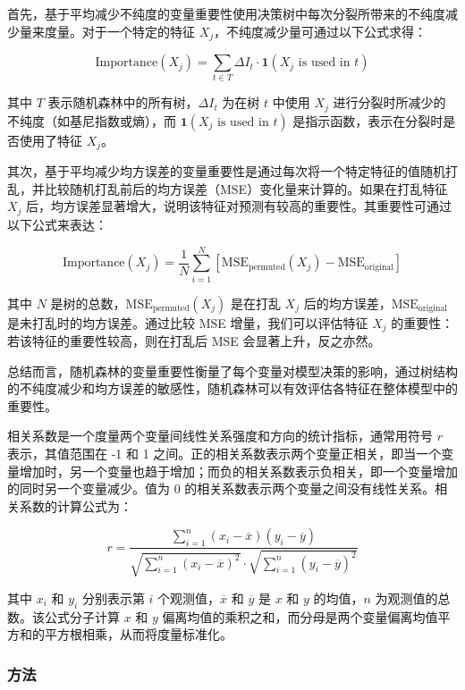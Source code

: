 \documentclass{article}
\begin{document}
	首先，基于平均减少不纯度的变量重要性使用决策树中每次分裂所带来的不纯度减少量来度量。对于一个特定的特征 \( X_j \)，不纯度减少量可通过以下公式求得：
	
	\[
	\text{Importance}(X_j) = \sum_{t \in T} \Delta I_t \cdot \mathbf{1}(X_j \text{ is used in } t)
	\]
	
	其中 \( T \) 表示随机森林中的所有树，\( \Delta I_t \) 为在树 \( t \) 中使用 \( X_j \) 进行分裂时所减少的不纯度（如基尼指数或熵），而 \( \mathbf{1}(X_j \text{ is used in } t) \) 是指示函数，表示在分裂时是否使用了特征 \( X_j \)。
	
	其次，基于平均减少均方误差的变量重要性是通过每次将一个特定特征的值随机打乱，并比较随机打乱前后的均方误差（MSE）变化量来计算的。如果在打乱特征 \( X_j \) 后，均方误差显著增大，说明该特征对预测有较高的重要性。其重要性可通过以下公式来表达：
	
	\[
	\text{Importance}(X_j) = \frac{1}{N} \sum_{i=1}^{N} \left[ \text{MSE}_{\text{permuted}}(X_j) - \text{MSE}_{\text{original}} \right]
	\]
	
	其中 \( N \) 是树的总数，\( \text{MSE}_{\text{permuted}}(X_j) \) 是在打乱 \( X_j \) 后的均方误差，\( \text{MSE}_{\text{original}} \) 是未打乱时的均方误差。通过比较 MSE 增量，我们可以评估特征 \( X_j \) 的重要性：若该特征的重要性较高，则在打乱后 MSE 会显著上升，反之亦然。
	
	总结而言，随机森林的变量重要性衡量了每个变量对模型决策的影响，通过树结构的不纯度减少和均方误差的敏感性，随机森林可以有效评估各特征在整体模型中的重要性。
	
	相关系数是一个度量两个变量间线性关系强度和方向的统计指标，通常用符号 \( r \) 表示，其值范围在 -1 和 1 之间。正的相关系数表示两个变量正相关，即当一个变量增加时，另一个变量也趋于增加；而负的相关系数表示负相关，即一个变量增加的同时另一个变量减少。值为 0 的相关系数表示两个变量之间没有线性关系。相关系数的计算公式为：
	
	\[
	r = \frac{\sum_{i=1}^{n} (x_i - \overline{x})(y_i - \overline{y})}{\sqrt{\sum_{i=1}^{n} (x_i - \overline{x})^2} \cdot \sqrt{\sum_{i=1}^{n} (y_i - \overline{y})^2}}
	\]
	
	其中 \( x_i \) 和 \( y_i \) 分别表示第 \( i \) 个观测值，\( \overline{x} \) 和 \( \overline{y} \) 是 \( x \) 和 \( y \) 的均值，\( n \) 为观测值的总数。该公式分子计算 \( x \) 和 \( y \) 偏离均值的乘积之和，而分母是两个变量偏离均值平方和的平方根相乘，从而将度量标准化。
	
		\subsubsection{方法}
	
\end{document}
